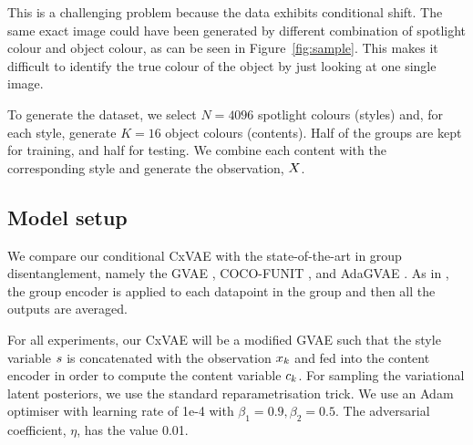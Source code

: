 \documentclass[../thesis.tex]{subfiles}
\begin{document}
This is a challenging problem because the data exhibits conditional shift.  The same exact image could have been generated by different combination of spotlight colour and object colour, as can be seen in Figure~\ref{fig:sample}. This makes it difficult to identify the true colour of the object by just looking at one single image. 



To generate the dataset, we select $N = \num{4096}$ spotlight colours (styles) and, for each style, generate $K = 16$ object colours (contents). Half of the groups are kept for training, and half for testing. We combine each content with the corresponding style and generate the observation, $\myrv{x}$. 

\subsection{Model setup} 

We compare our conditional CxVAE with the state-of-the-art in group disentanglement, namely the GVAE \citep{bouchacourt2017multi,hosoyaGroupbasedLearningDisentangled2019}, COCO-FUNIT \citep{saitoCOCOFUNITFewShotUnsupervised2020}, and AdaGVAE \citep{locatelloChallengingCommonAssumptions2019}. As in \citet{hosoyaGroupbasedLearningDisentangled2019}, the group encoder is applied to each datapoint in the group and then all the outputs are averaged.

For all experiments, our CxVAE will be a modified GVAE such that the style variable $s$ is concatenated with the observation $x_{k}$ and fed into the content encoder in order to compute the content variable $c_{k}$. For sampling the variational latent posteriors, we use the standard reparametrisation trick. We use an Adam optimiser with learning rate of 1e-4 with $\beta_1 = 0.9, \beta_2 = 0.5$. The adversarial coefficient, $\eta$, has the value 0.01.
\end{document}
